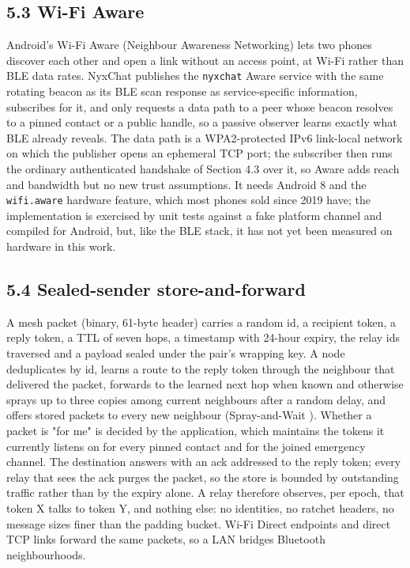 \documentclass[conference]{IEEEtran}
\begin{document}
\subsection{5.3 Wi-Fi Aware}
Android's Wi-Fi Aware (Neighbour Awareness Networking) lets two phones discover each other and open a link without an access point, at Wi-Fi rather than BLE data rates. NyxChat publishes the \texttt{nyxchat} Aware service with the same rotating beacon as its BLE scan response as service-specific information, subscribes for it, and only requests a data path to a peer whose beacon resolves to a pinned contact or a public handle, so a passive observer learns exactly what BLE already reveals. The data path is a WPA2-protected IPv6 link-local network on which the publisher opens an ephemeral TCP port; the subscriber then runs the ordinary authenticated handshake of Section 4.3 over it, so Aware adds reach and bandwidth but no new trust assumptions. It needs Android 8 and the \texttt{wifi.aware} hardware feature, which most phones sold since 2019 have; the implementation is exercised by unit tests against a fake platform channel and compiled for Android, but, like the BLE stack, it has not yet been measured on hardware in this work.

\subsection{5.4 Sealed-sender store-and-forward}
A mesh packet (binary, 61-byte header) carries a random id, a recipient token, a reply token, a TTL of seven hops, a timestamp with 24-hour expiry, the relay ids traversed and a payload sealed under the pair's wrapping key. A node deduplicates by id, learns a route to the reply token through the neighbour that delivered the packet, forwards to the learned next hop when known and otherwise sprays up to three copies among current neighbours after a random delay, and offers stored packets to every new neighbour (Spray-and-Wait \cite{ref8}). Whether a packet is "for me" is decided by the application, which maintains the tokens it currently listens on for every pinned contact and for the joined emergency channel. The destination answers with an ack addressed to the reply token; every relay that sees the ack purges the packet, so the store is bounded by outstanding traffic rather than by the expiry alone. A relay therefore observes, per epoch, that token X talks to token Y, and nothing else: no identities, no ratchet headers, no message sizes finer than the padding bucket. Wi-Fi Direct endpoints and direct TCP links forward the same packets, so a LAN bridges Bluetooth neighbourhoods.
\end{document}
